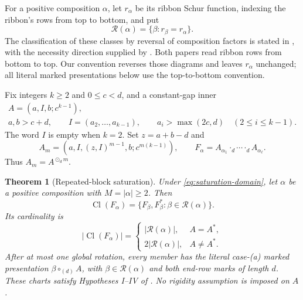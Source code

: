 \documentclass[11pt,a4paper]{amsart}
\numberwithin{equation}{section}
\theoremstyle{plain}
\newtheorem{theorem}{Theorem}[section]
\theoremstyle{definition}
\begin{document}
For a positive composition \(\alpha\), let \(r_\alpha\) be its ribbon
Schur function, indexing the ribbon's rows from top to bottom, and put
\[
 \mathcal R(\alpha)=\{\beta:r_\beta=r_\alpha\}.
\]
The classification of these classes by reversal of composition factors
is stated in \cite[Cor.~4.2]{Billera2006DecomposableCompositions},
with the necessity direction supplied by
\cite{Shields2026Coarsenings}.
Both papers read ribbon rows from bottom to top.  Our convention reverses
those diagrams and leaves \(r_\alpha\) unchanged; all literal marked
presentations below use the top-to-bottom convention.

Fix integers \(k\ge2\) and \(0\le c<d\), and a constant-gap inner
\begin{equation}\label{eq:saturation-domain}
 \begin{gathered}
 A=(a,I,b;c^{k-1}),\\
 a,b>c+d,\qquad
 I=(a_2,\ldots,a_{k-1}),\qquad
 a_i>\max(2c,d)\quad(2\le i\le k-1).
 \end{gathered}
\end{equation}
The word \(I\) is empty when \(k=2\).  Set \(z=a+b-d\) and
\begin{equation}\label{eq:repeated-blocks}
 A_m=(a,I,(z,I)^{m-1},b;c^{m(k-1)}),\qquad
 F_\alpha=A_{\alpha_1}\cdot_d\cdots\cdot_d A_{\alpha_\ell}.
\end{equation}
Thus \(A_m=A^{\odot_d m}\).

\begin{theorem}[Repeated-block saturation]\label{thm:repeated-block-saturation}
Under \eqref{eq:saturation-domain}, let \(\alpha\) be a positive
composition with \(M=|\alpha|\ge2\).  Then
\begin{equation}\label{eq:saturation-class}
 \operatorname{Cl}(F_\alpha)
 =\{F_\beta,F_\beta^*: \beta\in\mathcal R(\alpha)\}.
\end{equation}
Its cardinality is
\begin{equation}\label{eq:saturation-cardinality}
 |\operatorname{Cl}(F_\alpha)|=
 \begin{cases}
 |\mathcal R(\alpha)|,&A=A^*,\\
 2|\mathcal R(\alpha)|,&A\ne A^*.
 \end{cases}
\end{equation}
After at most one global rotation, every member has the literal
case-(a) marked presentation \(\beta\circ_{(d)}A\), with
\(\beta\in\mathcal R(\alpha)\) and both end-row marks of length
\(d\).  These charts satisfy Hypotheses I--IV of
\cite{McNamara2009Classification}.  No rigidity assumption is imposed on
\(A\).
\end{theorem}
\end{document}
